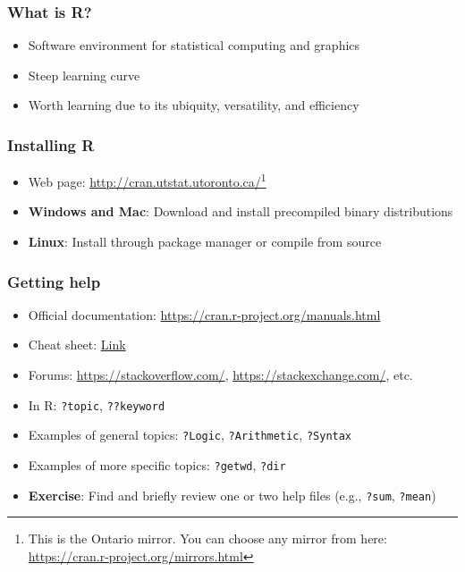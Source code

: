 \documentclass{beamer}
\begin{document}
\begin{frame}
    \frametitle{What is R?}
    \begin{itemize}
      \pause
	  \item Software environment for statistical computing and graphics
      \pause
	  \item Steep learning curve
      \pause
	  \item Worth learning due to its ubiquity, versatility, and efficiency
    \end{itemize}
\end{frame}


\begin{frame}
	\frametitle{Installing R}
	\begin{itemize}
	  \item Web page: \url{http://cran.utstat.utoronto.ca/}\footnote{This is the Ontario mirror. You can choose any mirror from here: \url{https://cran.r-project.org/mirrors.html}}
	  \item \textbf{Windows and Mac}: Download and install precompiled binary distributions
	  \item \textbf{Linux}: Install through package manager or compile from source
	\end{itemize}
\end{frame}


\begin{frame}
    \frametitle{Getting help}
    \begin{itemize}
	  \item Official documentation: \url{https://cran.r-project.org/manuals.html}
	  \item Cheat sheet: \href{https://cran.r-project.org/doc/contrib/Short-refcard.pdf}{Link}
	  \item Forums: \url{https://stackoverflow.com/}, \url{https://stackexchange.com/}, etc.
      \pause
	  \item In R: \texttt{?topic}, \texttt{??keyword}
      \pause
	  \item Examples of general topics: \texttt{?Logic}, \texttt{?Arithmetic}, \texttt{?Syntax}
      \pause
	  \item Examples of more specific topics: \texttt{?getwd}, \texttt{?dir}
      \pause
      \item \textbf{Exercise}: Find and briefly review one or two help files (e.g., \texttt{?sum}, \texttt{?mean})
    \end{itemize}
\end{frame}
\end{document}
